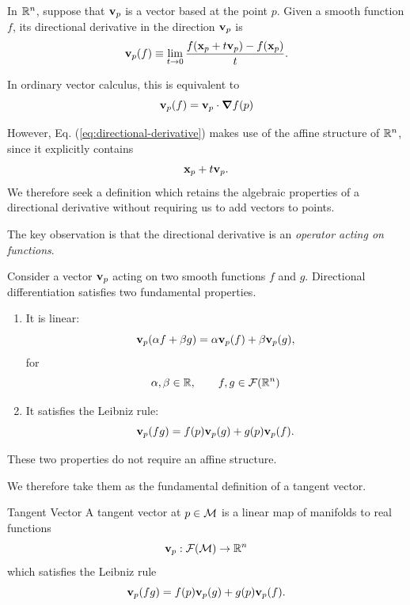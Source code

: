 		In $\mathbb{R}^n$, suppose that $\vb{v}_p$ is a vector based at the point
		$p$. Given a smooth function $f$, its directional derivative in the
		direction $\vb{v}_p$ is
		\begin{equation}
			\vb{v}_p(f)
			\equiv
			\lim_{t\to0}
			\frac{
			f(\vb{x}_p+t\vb{v}_p)-f(\vb{x}_p)
			}{t}.
			\label{eq:directional-derivative}
		\end{equation}

		In ordinary vector calculus, this is equivalent to
		\begin{equation}
			\vb{v}_p(f)
			=
			\vb{v}_p\cdot\grad f(p)
			\label{eq:directional-derivative-gradient}
		\end{equation}

		However, Eq. (\ref{eq:directional-derivative}) makes use of the
		affine structure of $\mathbb{R}^n$, since it explicitly contains
		\[
			\vb{x}_p+t\vb{v}_p.
		\]
		We therefore seek a definition which retains the algebraic properties
		of a directional derivative without requiring us to add vectors to
		points.

		The key observation is that the directional derivative is an
		\textit{operator acting on functions}.

		Consider a vector $\vb{v}_p$ acting on two smooth functions $f$ and
		$g$. Directional differentiation satisfies two fundamental
		properties.
		\begin{enumerate}[(1)]
			\item It is linear:
				\begin{equation}
					\vb{v}_p(\alpha f+\beta g)
					=
					\alpha\vb{v}_p(f)
					+
					\beta\vb{v}_p(g),
					\label{eq:vector-linearity}
				\end{equation}
				for
				\[
					\alpha,\beta\in\mathbb{R},\qquad f,g\in\mathcal{F}(\mathbb{R}^n)
				\]
			\item It satisfies the Leibniz rule:
				\begin{equation}
					\vb{v}_p(fg)
					=
					f(p)\vb{v}_p(g)
					+
					g(p)\vb{v}_p(f).
					\label{eq:vector-leibniz}
				\end{equation}
		\end{enumerate}
		These two properties do not require an affine structure.

		We therefore take them as the fundamental definition of a tangent
		vector.

		\begin{definition}{Tangent Vector}
			A tangent vector at $p\in\mathcal{M}$ is a linear map of manifolds to real functions 
			\begin{equation}
				\vb{v}_p:
				\mathcal{F}(\mathcal{M})\to\mathbb{R}^n
				\label{eq:tangent-vector-definition}
				\end{equation}
				which satisfies the Leibniz rule
				\begin{equation}
				\vb{v}_p(fg)
				=
				f(p)\vb{v}_p(g)
				+
				g(p)\vb{v}_p(f).
				\label{eq:tangent-vector-leibniz}
			\end{equation}
		\end{definition}

